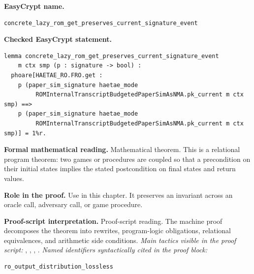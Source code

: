 \begin{formaltheorem}
\noindent\textbf{EasyCrypt name.}
\begin{lstlisting}[language=EasyCrypt,basicstyle=\ttfamily\scriptsize]
concrete_lazy_rom_get_preserves_current_signature_event
\end{lstlisting}
\noindent\textbf{Checked EasyCrypt statement.}
\begin{lstlisting}[language=EasyCrypt,basicstyle=\ttfamily\scriptsize]
lemma concrete_lazy_rom_get_preserves_current_signature_event
    m ctx smp (p : signature -> bool) :
  phoare[HAETAE_RO.FRO.get :
    p (paper_sim_signature haetae_mode
         ROMInternalTranscriptBudgetedPaperSimAsNMA.pk_current m ctx smp) ==>
    p (paper_sim_signature haetae_mode
         ROMInternalTranscriptBudgetedPaperSimAsNMA.pk_current m ctx smp)] = 1%r.
\end{lstlisting}
\noindent\textbf{Formal mathematical reading.}
Mathematical theorem. This is a relational program theorem: two games or procedures are coupled so that a precondition on their initial states implies the stated postcondition on final states and return values.

\noindent\textbf{Role in the proof.}
Use in this chapter. It preserves an invariant across an oracle call, adversary call, or game procedure.

\noindent\textbf{Proof-script interpretation.}
Proof-script reading. The machine proof decomposes the theorem into rewrites, program-logic obligations, relational equivalences, and arithmetic side conditions.
\emph{Main tactics visible in the proof script:} , , , .
\emph{Named identifiers syntactically cited in the proof block:}
\begin{lstlisting}[language=EasyCrypt,basicstyle=\ttfamily\scriptsize]
ro_output_distribution_lossless
\end{lstlisting}

\end{formaltheorem}

